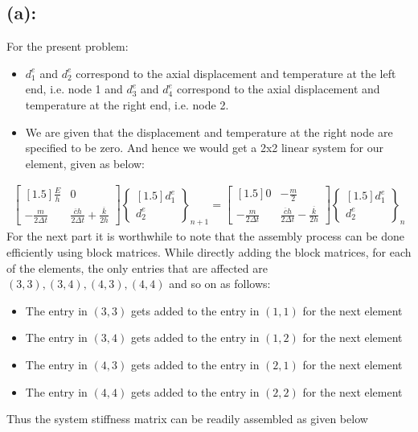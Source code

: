 \subsection*{(a): }
For the present problem: 
\begin{itemize}
\item $d^e_1$ and $d^e_2$ correspond to the axial displacement and temperature at the left end, i.e. node 1 and $d^e_3$ and $d^e_4$ correspond to the axial displacement and temperature at the right end, i.e. node 2. 
\item We are given that the displacement and temperature at the right node are specified to be zero. And hence we would get a 2x2 linear system for our element, given as below:
\end{itemize}
\begin{align*}
\begin{bmatrix}[1.5]
\frac{E}{h} & 0 \\
-\frac{m}{2\Delta t} & \frac{\overline{c}h}{2\Delta t}+ \frac{\overline{k}}{2h}
\end{bmatrix}
\begin{Bmatrix}[1.5]
d^e_1 \\ d^e_2
\end{Bmatrix}_{n+1}
=
\begin{bmatrix}[1.5]
0 & -\frac{m}{2} \\
-\frac{m}{2\Delta t} & \frac{\overline{c}h}{2\Delta t}-\frac{\overline{k}}{2h} 
\end{bmatrix}
\begin{Bmatrix}[1.5]
d^e_1 \\ d^e_2
\end{Bmatrix}_{n}
\end{align*}
For the next part it is worthwhile to note that the assembly process can be done efficiently using block matrices. While directly adding the block matrices, for each of the elements, the only entries that are affected are $(3,3),(3,4),(4,3),(4,4)$ and so on as follows: 
\begin{itemize}
\item The entry in $(3,3)$ gets added to the entry in $(1,1)$ for the next element
\item The entry in $(3,4)$ gets added to the entry in $(1,2)$ for the next element
\item The entry in $(4,3)$ gets added to the entry in $(2,1)$ for the next element
\item The entry in $(4,4)$ gets added to the entry in $(2,2)$ for the next element
\end{itemize} 
Thus the system stiffness matrix can be readily assembled as given below
